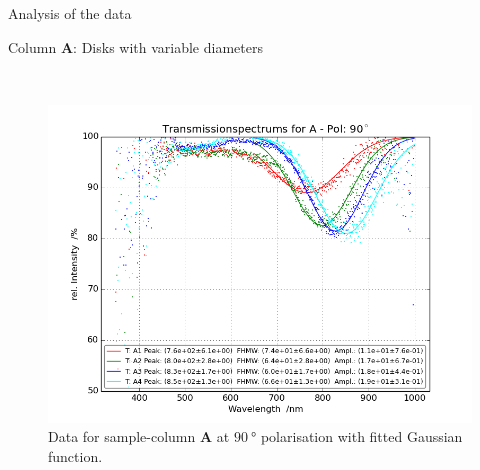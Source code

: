 \documentclass[pdftex, a4paper,11pt, twoside, UKenglish]{report}
\begin{document}
\begin{chapter}{Analysis of the data}
\begin{section}{Column \textbf{A}: Disks with variable diameters}
\begin{figure}[ht!]
\begin{minipage}{.95\textwidth}
          \label{fig:TransspecFIT_APol0}
        \end{minipage}\\
        \begin{minipage}{.95\textwidth}
          \centering
          \includegraphics[width=\textwidth]
              {Figures/TransspecFIT_APol90.png}
          \caption{Data for sample-column \textbf{A} at $\SI{90}{\degree}$
              polarisation with fitted Gaussian function.}
          \label{fig:TransspecFIT_APol90}
        \end{minipage}
      \end{figure}
      
    \end{section}
    
    
    

\end{chapter}
\end{document}
